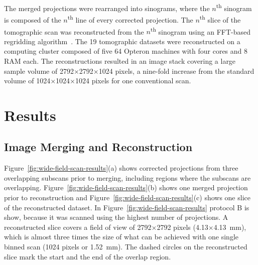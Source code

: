 \documentclass[preprint,s]{iucr}
\begin{document}
The merged projections were rearranged into sinograms, where the $n$\textsuperscript{th} sinogram is composed of the $n$\textsuperscript{th} line of every corrected projection. The $n$\textsuperscript{th} slice of the tomographic scan was reconstructed from the $n$\textsuperscript{th} sinogram using an FFT-based regridding algorithm~\cite{Dowd1999}. The 19 tomographic datasets were reconstructed on a computing cluster composed of five \SI{64}{\bit} Opteron machines with four cores and \SI{8}{\giga\byte} RAM each. The reconstructions resulted in an image stack covering a large sample volume of 2792$\times$2792$\times$1024 pixels, a nine-fold increase from the standard volume of 1024$\times$1024$\times$1024 pixels for one conventional scan.

\section{Results}\label{sec:Results}
\subsection{Image Merging and Reconstruction}\label{sec:Image Merging and Reconstruction}
Figure~\ref{fig:wide-field-scan-results}(a) shows corrected projections from three overlapping subscans prior to merging, including regions where the subscans are overlapping. Figure~\ref{fig:wide-field-scan-results}(b) shows one merged projection prior to reconstruction and Figure~\ref{fig:wide-field-scan-results}(c) shows one slice of the reconstructed dataset. In Figure~\ref{fig:wide-field-scan-results} protocol B is show, because it was scanned using the highest number of projections. A reconstructed slice covers a field of view of 2792$\times$2792 pixels (4.13$\times$\SI{4.13}{\milli\meter}), which is almost three times the size of what can be achieved with one single binned scan (1024 pixels or \SI{1.52}{\milli\meter}). %
The dashed circles on the reconstructed slice mark the start and the end of the overlap region.
\end{document}

